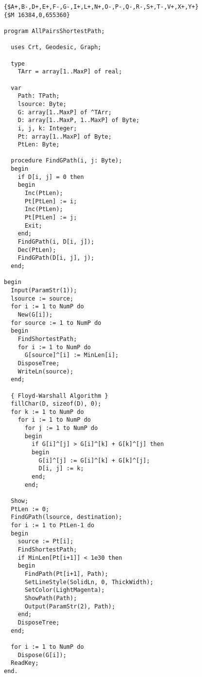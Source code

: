 
\english 
\addtolength{\baselineskip}{-4mm}
\begin{verbatim}
{$A+,B-,D+,E+,F-,G-,I+,L+,N+,O-,P-,Q-,R-,S+,T-,V+,X+,Y+}
{$M 16384,0,655360}

program AllPairsShortestPath;

  uses Crt, Geodesic, Graph;

  type
    TArr = array[1..MaxP] of real;

  var
    Path: TPath;
    lsource: Byte;
    G: array[1..MaxP] of ^TArr;
    D: array[1..MaxP, 1..MaxP] of Byte;
    i, j, k: Integer;
    Pt: array[1..MaxP] of Byte;
    PtLen: Byte;

  procedure FindGPath(i, j: Byte);
  begin
    if D[i, j] = 0 then
    begin
      Inc(PtLen);
      Pt[PtLen] := i;
      Inc(PtLen);
      Pt[PtLen] := j;
      Exit;
    end;
    FindGPath(i, D[i, j]);
    Dec(PtLen);
    FindGPath(D[i, j], j);
  end;

begin
  Input(ParamStr(1));
  lsource := source;
  for i := 1 to NumP do
    New(G[i]);
  for source := 1 to NumP do
  begin
    FindShortestPath;
    for i := 1 to NumP do
      G[source]^[i] := MinLen[i];
    DisposeTree;
    WriteLn(source);
  end;

  { Floyd-Warshall Algorithm }
  fillChar(D, sizeof(D), 0);
  for k := 1 to NumP do
    for i := 1 to NumP do
      for j := 1 to NumP do
      begin
        if G[i]^[j] > G[i]^[k] + G[k]^[j] then
        begin
          G[i]^[j] := G[i]^[k] + G[k]^[j];
          D[i, j] := k;
        end;
      end;

  Show;
  PtLen := 0;
  FindGPath(lsource, destination);
  for i := 1 to PtLen-1 do
  begin
    source := Pt[i];
    FindShortestPath;
    if MinLen[Pt[i+1]] < 1e30 then
    begin
      FindPath(Pt[i+1], Path);
      SetLineStyle(SolidLn, 0, ThickWidth);
      SetColor(LightMagenta);
      ShowPath(Path);
      Output(ParamStr(2), Path);
    end;
    DisposeTree;
  end;

  for i := 1 to NumP do
    Dispose(G[i]);
  ReadKey;
end.

\end{verbatim}
\addtolength{\baselineskip}{4mm}
\farsi 
